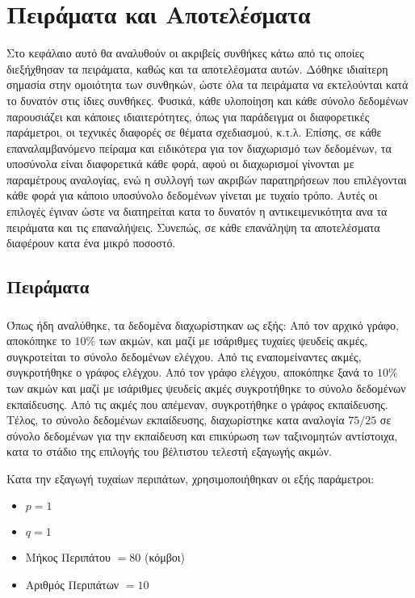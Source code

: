 \chapter{Πειράματα και Αποτελέσματα}

Στο κεφάλαιο αυτό θα αναλυθούν οι ακριβείς συνθήκες κάτω από τις οποίες διεξήχθησαν τα πειράματα,
καθώς και τα αποτελέσματα αυτών. Δόθηκε ιδιαίτερη σημασία στην ομοιότητα των συνθηκών, ώστε όλα
τα πειράματα να εκτελούνται κατά το δυνατόν στις ίδιες συνθήκες. Φυσικά, κάθε υλοποίηση και κάθε
σύνολο δεδομένων παρουσιάζει και κάποιες ιδιαιτερότητες, όπως για παράδειγμα οι διαφορετικές 
παράμετροι, οι τεχνικές διαφορές σε θέματα σχεδιασμού, κ.τ.λ. Επίσης, σε κάθε επαναλαμβανόμενο πείραμα
και ειδικότερα για τον διαχωρισμό των δεδομένων, τα υποσύνολα είναι διαφορετικά κάθε φορά, αφού
οι διαχωρισμοί γίνονται με παραμέτρους αναλογίας, ενώ η συλλογή των ακριβών παρατηρήσεων που
επιλέγονται κάθε φορά για κάποιο υποσύνολο δεδομένων γίνεται με τυχαίο τρόπο. Αυτές οι επιλογές έγιναν
ώστε να διατηρείται κατα το δυνατόν η αντικειμενικότητα ανα τα πειράματα και τις επαναλήψεις. Συνεπώς,
σε κάθε επανάληψη τα αποτελέσματα διαφέρουν κατα ένα μικρό ποσοστό.

\section{Πειράματα}

\subsection{}

Όπως ήδη αναλύθηκε, τα δεδομένα διαχωρίστηκαν ως εξής: Από τον αρχικό γράφο, αποκόπηκε το \(10\%\)
των ακμών, και μαζί με ισάριθμες τυχαίες ψευδείς ακμές, συγκροτείται το σύνολο δεδομένων ελέγχου.
Από τις εναπομείναντες ακμές, συγκροτήθηκε ο γράφος ελέγχου. Από τον γράφο ελέγχου, αποκόπηκε
ξανά το \(10\%\) των ακμών και μαζί με ισάριθμες ψευδείς ακμές συγκροτήθηκε το σύνολο δεδομένων 
εκπαίδευσης. Από τις ακμές που απέμεναν, συγκροτήθηκε ο γράφος εκπαίδευσης. Τέλος, το σύνολο
δεδομένων εκπαίδευσης, διαχωρίστηκε κατα αναλογία \(75/25\) σε σύνολο δεδομένων για την εκπαίδευση
και επικύρωση των ταξινομητών αντίστοιχα, κατα το στάδιο της επιλογής του βέλτιστου τελεστή 
εξαγωγής ακμών.

Κατα την εξαγωγή τυχαίων περιπάτων, χρησιμοποιήθηκαν οι εξής παράμετροι:

\begin{itemize}
    \item \(p = 1\)
    \item \(q = 1\)
    \item Μήκος Περιπάτου \( = 80\) (κόμβοι)
    \item Αριθμός Περιπάτων \( = 10\)
\end{itemize}

